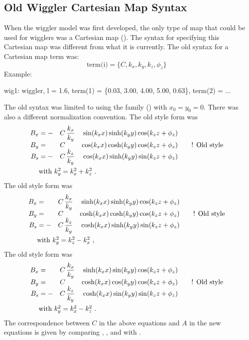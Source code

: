 {%
\subsection{Old Wiggler Cartesian Map Syntax}
\label{s:old.wiggler}

When the wiggler model was first developed, the only type of map that could be used for  wigglers was a Cartesian map (). The syntax for specifying this Cartesian
map was different from what it is currently. The old syntax for a Cartesian map term was:
\begin{equation}
  \text{term(i)} = \{C, k_x, k_y, k_z, \phi_z \}
\end{equation}
Example:
\begin{example}
  wig1: wiggler, l = 1.6, 
        term(1) = \{0.03, 3.00, 4.00, 5.00, 0.63\},
        term(2) = ...
\end{example}

The old syntax was limited to using the   family ()
with $x_0 = y_0 = 0$. There was also a different normalization convention. The old style
 form was
\begin{alignat}{5}
  B_x &= -& C \, &\dfrac{k_x}{k_y} & \sin(k_x x) \sinh(k_y y) \cos(\kzz) &\CRNEG
  B_y &=  & C \, &                 & \cos(k_x x) \cosh(k_y y) \cos(\kzz) &\qquad \text{! Old style} \CRNEG
  B_s &= -& C \, &\dfrac{k_z}{k_y} & \cos(k_x x) \sinh(k_y y) \sin(\kzz) &\label{f1} \\
  & \makebox[1pt][l]{with $k_y^2 = k_x^2 + k_z^2$ .} &&&&  \nonumber
\end{alignat}
The old style  form was
\begin{alignat}{5}
  B_x &=  & C \, &\dfrac{k_x}{k_y} & \sinh(k_x x) \sinh(k_y y) \cos(\kzz) &\CRNEG
  B_y &=  & C \, &                 & \cosh(k_x x) \cosh(k_y y) \cos(\kzz) &\qquad \text{! Old style} \CRNEG
  B_s &= -& C \, &\dfrac{k_z}{k_y} & \cosh(k_x x) \sinh(k_y y) \sin(\kzz) &\label{f2} \\
  & \makebox[1pt][l]{with $k_y^2 = k_z^2 - k_x^2$ ,} &&&&  \nonumber
\end{alignat}
The old style  form was
\begin{alignat}{5}
  B_x &=  & C \, &\dfrac{k_x}{k_y} & \sinh(k_x x) \sin(k_y y) \cos(\kzz) &\CRNEG
  B_y &=  & C \, &                 & \cosh(k_x x) \cos(k_y y) \cos(\kzz) &\qquad \text{! Old style} \CRNEG
  B_s &= -& C \, &\dfrac{k_z}{k_y} & \cosh(k_x x) \sin(k_y y) \sin(\kzz) &\label{f3} \\
  & \makebox[1pt][l]{with $k_y^2 = k_x^2 - k_z^2$ .} &&&& \nonumber
\end{alignat}
The correspondence between $C$ in the above equations and $A$ in the new equations is
given by comparing , , and  with .

}

